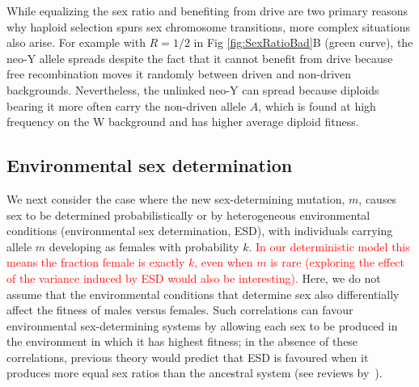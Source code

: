 \documentclass[10pt,letterpaper]{article}
\begin{document}
%
%

While equalizing the sex ratio and benefiting from drive are two primary reasons why haploid selection spurs sex chromosome transitions, more complex situations also arise.  
For example with $R=1/2$ in Fig \ref{fig:SexRatioBad}B (green curve), the neo-Y allele spreads despite the fact that it cannot benefit from drive because free recombination moves it randomly between driven and non-driven backgrounds.  
Nevertheless, the unlinked neo-Y can spread because diploids bearing it more often carry the non-driven allele $A$, which is found at high frequency on the W background and has higher average diploid fitness.%

\subsection*{Environmental sex determination}

We next consider the case where the new sex-determining mutation, $m$, causes sex to be determined probabilistically or by heterogeneous environmental conditions (environmental sex determination, ESD), with individuals carrying allele $m$ developing as females with probability $k$.
\textcolor{red}{In our deterministic model this means the fraction female is exactly $k$, even when $m$ is rare (exploring the effect of the variance induced by ESD would also be interesting).}
Here, we do not assume that the environmental conditions that determine sex also differentially affect the fitness of males versus females. 
Such correlations can favour environmental sex-determining systems by allowing each sex to be produced in the environment in which it has highest fitness; in the absence of these correlations, previous theory would predict that ESD is favoured when it produces more equal sex ratios than the ancestral system (see reviews by~\cite{Charnov:1982wg,Bull:1983vi,West:2009we}). %
\end{document}
